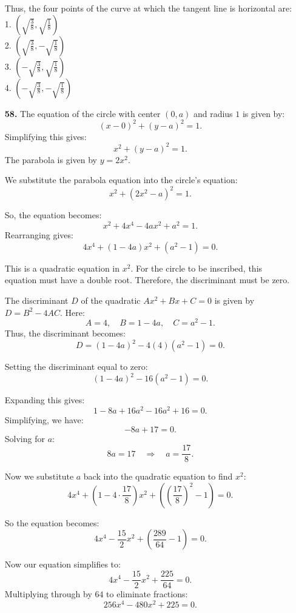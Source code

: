 \documentclass[12pt]{article}
\begin{document}
\begin{enumerate}[start=1,label={\bfseries. },leftmargin=1in]
    Thus, the four points of the curve at which the tangent line is horizontal are:
    1. \(\left(\sqrt{\frac{3}{8}}, \sqrt{\frac{1}{8}}\right)\)\\
    2. \(\left(\sqrt{\frac{3}{8}}, -\sqrt{\frac{1}{8}}\right)\)\\
    3. \(\left(-\sqrt{\frac{3}{8}}, \sqrt{\frac{1}{8}}\right)\)\\
    4. \(\left(-\sqrt{\frac{3}{8}}, -\sqrt{\frac{1}{8}}\right)\)\\

\item [\textbf{58.}] 
    The equation of the circle with center \( (0, a) \) and radius \( 1 \) is given by:
    \[
    (x - 0)^2 + (y - a)^2 = 1.
    \]
    Simplifying this gives:
    \[
    x^2 + (y - a)^2 = 1.
    \]
    The parabola is given by \( y = 2x^2 \).

    We substitute the parabola equation into the circle's equation:
    \[
    x^2 + (2x^2 - a)^2 = 1.
    \]

    So, the equation becomes:
    \[
    x^2 + 4x^4 - 4ax^2 + a^2 = 1.
    \]
    Rearranging gives:
    \[
    4x^4 + (1 - 4a)x^2 + (a^2 - 1) = 0.
    \]

    This is a quadratic equation in \( x^2 \). For the circle to be inscribed, this equation must have a double root. Therefore, the discriminant must be zero.

    The discriminant \( D \) of the quadratic \( Ax^2 + Bx + C = 0 \) is given by \( D = B^2 - 4AC \). Here:
    \[
    A = 4, \quad B = 1 - 4a, \quad C = a^2 - 1.
    \]
    Thus, the discriminant becomes:
    \[
    D = (1 - 4a)^2 - 4(4)(a^2 - 1) = 0.
    \]

    Setting the discriminant equal to zero:
    \[
    (1 - 4a)^2 - 16(a^2 - 1) = 0.
    \]

    Expanding this gives:
    \[
    1 - 8a + 16a^2 - 16a^2 + 16 = 0.
    \]
    Simplifying, we have:
    \[
    -8a + 17 = 0.
    \]
    Solving for \( a \):
    \[
    8a = 17 \quad \Rightarrow \quad a = \frac{17}{8}.
    \]

    Now we substitute \( a \) back into the quadratic equation to find \( x^2 \):
    \[
    4x^4 + (1 - 4 \cdot \frac{17}{8})x^2 + \left(\left(\frac{17}{8}\right)^2 - 1\right) = 0.
    \]

    So the equation becomes:
    \[
    4x^4 - \frac{15}{2}x^2 + \left(\frac{289}{64} - 1\right) = 0.
    \]

    Now our equation simplifies to:
    \[
    4x^4 - \frac{15}{2}x^2 + \frac{225}{64} = 0.
    \]
    Multiplying through by \( 64 \) to eliminate fractions:
    \[
    256x^4 - 480x^2 + 225 = 0.
    \]


\end{enumerate}
\end{document}
